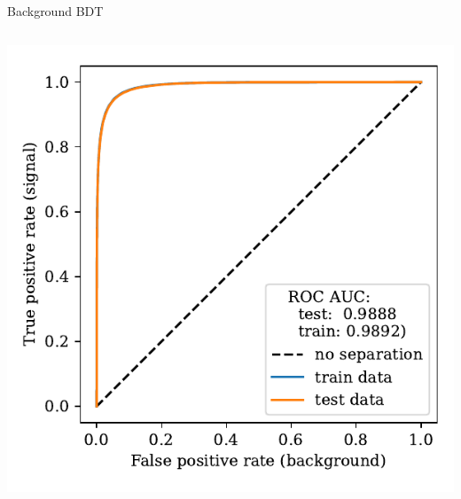 \documentclass[aspectratio=1610, 10pt]{beamer}
\begin{document}
\begin{frame}{Background BDT}
\begin{columns}
\begin{column}{0.33\textwidth}
      \centering
      \includegraphics[width=\textwidth]{images/backup/bkg_roc.pdf}
    \end{column}
  \end{columns}
\end{frame}
\end{document}
